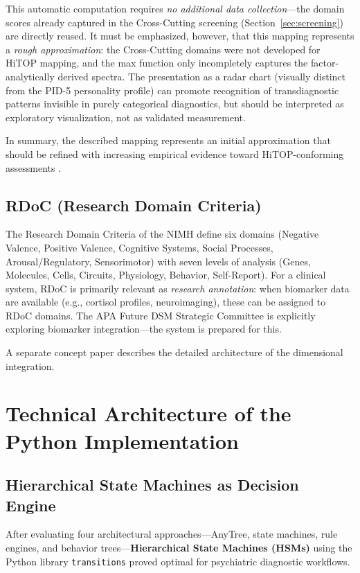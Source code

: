 \documentclass[11pt,a4paper]{article}
\begin{document}
This automatic computation requires \textit{no additional data collection}---the domain scores already captured in the Cross-Cutting screening (Section~\ref{sec:screening}) are directly reused. It must be emphasized, however, that this mapping represents a \textit{rough approximation}: the Cross-Cutting domains were not developed for HiTOP mapping, and the max function only incompletely captures the factor-analytically derived spectra. The presentation as a radar chart (visually distinct from the PID-5 personality profile) can promote recognition of transdiagnostic patterns invisible in purely categorical diagnostics, but should be interpreted as exploratory visualization, not as validated measurement.

In summary, the described mapping represents an initial approximation that should be refined with increasing empirical evidence toward HiTOP-conforming assessments \citep{Kotov2021}.

\subsection{RDoC (Research Domain Criteria)}

The Research Domain Criteria of the NIMH \citep{Insel2010} define six domains (Negative Valence, Positive Valence, Cognitive Systems, Social Processes, Arousal/Regulatory, Sensorimotor) with seven levels of analysis (Genes, Molecules, Cells, Circuits, Physiology, Behavior, Self-Report). For a clinical system, RDoC is primarily relevant as \textit{research annotation}: when biomarker data are available (e.g., cortisol profiles, neuroimaging), these can be assigned to RDoC domains. The APA Future DSM Strategic Committee is explicitly exploring biomarker integration---the system is prepared for this.

A separate concept paper describes the detailed architecture of the dimensional integration.

\section{Technical Architecture of the Python Implementation}
\label{sec:technik}

\subsection{Hierarchical State Machines as Decision Engine}

After evaluating four architectural approaches---AnyTree, state machines, rule engines, and behavior trees---\textbf{Hierarchical State Machines (HSMs)} using the Python library \texttt{transitions} proved optimal for psychiatric diagnostic workflows.
\end{document}
